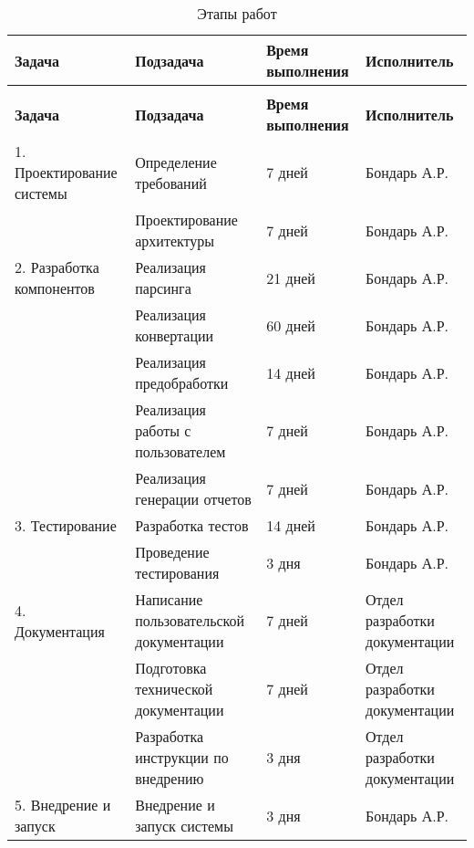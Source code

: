 \begin{longtable}{|p{4.5cm}|p{4cm}|p{3cm}|p{4cm}|}
	\caption{Этапы работ} \label{table:stages} \\
	\hline
	\textbf{Задача}
	& \textbf{Подзадача}
	& \textbf{Время выполнения}
	& \textbf{Исполнитель} \\
	\hline
	\endfirsthead
	\conttable{table:stages} \\
	\hline
	\textbf{Задача}
	& \textbf{Подзадача}
	& \textbf{Время выполнения}
	& \textbf{Исполнитель} \\
	\hline
	\endhead
	1. Проектирование системы
	& Определение требований
	& 7 дней
	& Бондарь А.Р. \\ \hline

	& Проектирование архитектуры
	& 7 дней
	& Бондарь А.Р. \\ \hline

	2. Разработка компонентов
	& Реализация парсинга
	& 21 дней
	& Бондарь А.Р. \\ \hline

	& Реализация конвертации
	& 60 дней
	& Бондарь А.Р. \\ \hline

	& Реализация предобработки
	& 14 дней
	& Бондарь А.Р. \\ \hline

	& Реализация работы с пользователем
	& 7 дней
	& Бондарь А.Р. \\ \hline

	& Реализация генерации отчетов
	& 7 дней
	& Бондарь А.Р. \\ \hline

	3. Тестирование
	& Разработка тестов
	& 14 дней
	& Бондарь А.Р. \\ \hline

	& Проведение тестирования
	& 3 дня
	& Бондарь А.Р. \\ \hline

	4. Документация
	& Написание пользовательской документации
	& 7 дней
	& Отдел разработки документации \\ \hline

	& Подготовка технической документации
	& 7 дней
	& Отдел разработки документации \\ \hline

	& Разработка инструкции по внедрению
	& 3 дня
	& Отдел разработки документации \\ \hline

	5. Внедрение и запуск
	& Внедрение и запуск системы
	& 3 дня
	& Бондарь А.Р. \\ \hline
\end{longtable}

